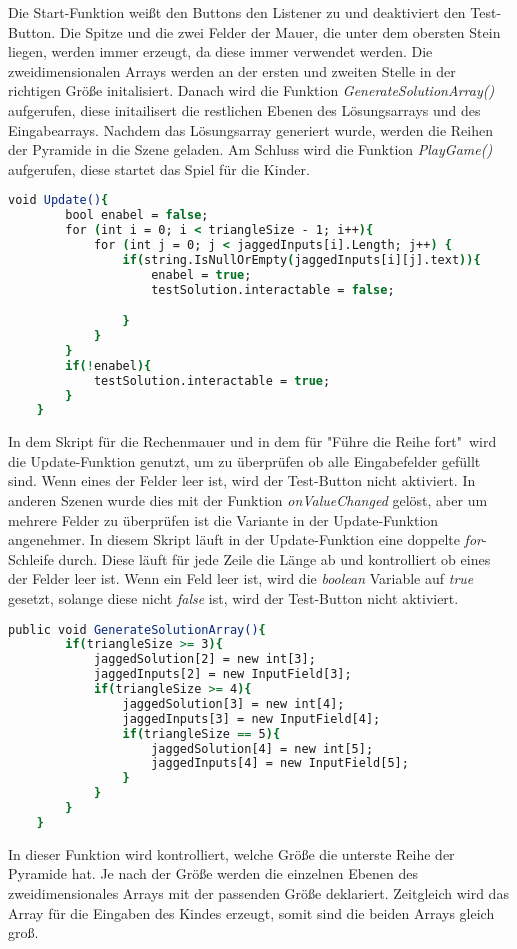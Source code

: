 Die Start-Funktion weißt den Buttons den Listener zu und deaktiviert den Test-Button. Die Spitze und die zwei Felder der Mauer, die unter dem obersten Stein liegen, werden immer erzeugt, da diese immer verwendet werden. Die zweidimensionalen Arrays werden an der ersten und zweiten Stelle in der richtigen Größe initalisiert. Danach wird die Funktion \textit{GenerateSolutionArray()} aufgerufen, diese initailisert die restlichen Ebenen des Lösungsarrays und des Eingabearrays. Nachdem das Lösungsarray generiert wurde, werden die Reihen der Pyramide in die Szene geladen. Am Schluss wird die Funktion \textit{PlayGame()} aufgerufen, diese startet das Spiel für die Kinder.\\
\begin{lstlisting}[language=csh, caption={Triangle.cs Update-Funktion}]
	void Update(){
		bool enabel = false;
		for (int i = 0; i < triangleSize - 1; i++){
			for (int j = 0; j < jaggedInputs[i].Length; j++) {
				if(string.IsNullOrEmpty(jaggedInputs[i][j].text)){
					enabel = true;
					testSolution.interactable = false;

				}
			}
		}
		if(!enabel){
			testSolution.interactable = true;
		}
	}
\end{lstlisting}
In dem Skript für die Rechenmauer und in dem für "Führe die Reihe fort"\, wird die Update-Funktion genutzt, um zu überprüfen ob alle Eingabefelder gefüllt sind. Wenn eines der Felder leer ist, wird der Test-Button nicht aktiviert. In anderen Szenen wurde dies mit der Funktion \textit{onValueChanged} gelöst, aber um mehrere Felder zu überprüfen ist die Variante in der Update-Funktion angenehmer. In diesem Skript läuft in der Update-Funktion eine doppelte \textit{for}-Schleife durch. Diese läuft für jede Zeile die Länge ab und kontrolliert ob eines der Felder leer ist. Wenn ein Feld leer ist, wird die \textit{boolean} Variable auf \textit{true} gesetzt, solange diese nicht \textit{false} ist, wird der Test-Button nicht aktiviert.\\
\begin{lstlisting}[language=csh, caption={Triangle.cs GenerateSolutionArray-Funktion}]
	public void GenerateSolutionArray(){
		if(triangleSize >= 3){
			jaggedSolution[2] = new int[3];
			jaggedInputs[2] = new InputField[3];
			if(triangleSize >= 4){
				jaggedSolution[3] = new int[4];
				jaggedInputs[3] = new InputField[4];
				if(triangleSize == 5){
					jaggedSolution[4] = new int[5];
					jaggedInputs[4] = new InputField[5];
				}
			}
		}
	}
\end{lstlisting}
In dieser Funktion wird kontrolliert, welche Größe die unterste Reihe der Pyramide hat. Je nach der Größe werden die einzelnen Ebenen des zweidimensionales Arrays mit der passenden Größe deklariert. Zeitgleich wird das Array für die Eingaben des Kindes erzeugt, somit sind die beiden Arrays gleich groß.\\
